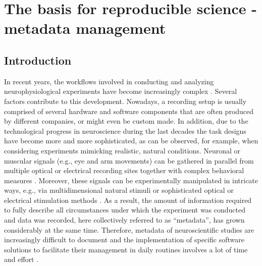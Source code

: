 \clearpage
\chapter[Metadata management]{The basis for reproducible science - metadata management}
\label{sec:metadata}


\section{Introduction}
\label{sec:Introduction}

In recent years, the workflows involved in conducting and analyzing neurophysiological experiments have become increasingly complex \citep[e.g.][]{Coles_2008, Denker_2016, Brochier_2018}. Several factors contribute to this development. Nowadays, a recording setup is usually comprised of several hardware and software components that are often produced by different companies, or might even be custom made. In addition, due to the technological progress in neuroscience during the last decades the task designs have become more and more sophisticated, as can be observed, for example, when considering experiments mimicking realistic, natural conditions. Neuronal or muscular signals (e.g., eye and arm movements) can be gathered in parallel from multiple optical or electrical recording sites \citep{Nicolelis_2002,Verkhratsky_2006,Obien_2014} together with complex behavioral measures \citep{Jacob_2010,Maldonado_2008,Vargas-Irwin_2010,Schwarz_2014}. Moreover, these signals can be experimentally manipulated in intricate ways, e.g., via multidimensional natural stimuli \citep{Geisler_2008} or sophisticated optical or electrical stimulation methods \citep{Deisseroth_2013,Miyamoto_2015}. As a result, the amount of information required to fully describe all circumstances under which the experiment was conducted and data was recorded, here collectively referred to as ``metadata'', has grown considerably at the same time. Therefore, metadata of neuroscientific studies are increasingly difficult to document and the implementation of specific software solutions to facilitate their management in daily routines involves a lot of time and effort \citep{Zehl_2016}.

